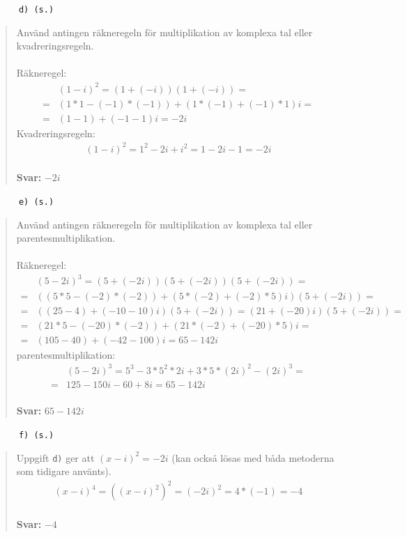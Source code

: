 \documentclass[a4paper]{article}
\newcommand{\tskcol}[1]{\textcolor{tskcol}{#1}}
\begin{document}
	\texttt{\tskcol{~~~~~~d) (s.)}}
	\begin{quotation}
		\noindent
		Använd antingen räkneregeln för multiplikation av komplexa tal eller kvadreringsregeln. \\ \\
		Räkneregel:
		\begin{align*}
		&(1-i)^2=
		(1+(-i))(1+(-i))= \\ =
		&(1*1-(-1)*(-1))+(1*(-1)+(-1)*1)i= \\ =
		&(1-1)+(-1-1)i=
		-2i
		\end{align*}
		Kvadreringsregeln:
		\begin{align*}
		(1-i)^2=
		1^2-2i+i^2=
		1-2i-1=
		-2i
		\end{align*}
		\\
		\textbf{Svar:} $-2i$
	\end{quotation}
	
	\pagebreak
	\texttt{\tskcol{~~~~~~e) (s.)}}
	\begin{quotation}
		\noindent
		Använd antingen räkneregeln för multiplikation av komplexa tal eller parentesmultiplikation. \\ \\
		Räkneregel:
		\begin{align*}
		&(5-2i)^3=
		(5+(-2i))(5+(-2i))(5+(-2i))= \\ =
		&((5*5-(-2)*(-2))+(5*(-2)+(-2)*5)i)(5+(-2i))= \\ =
		&((25-4)+(-10-10)i)(5+(-2i))=
		(21+(-20)i)(5+(-2i))= \\ =
		&(21*5-(-20)*(-2))+(21*(-2)+(-20)*5)i= \\ =
		&(105-40)+(-42-100)i= 
		65-142i
		\end{align*}
		parentesmultiplikation:
		\begin{align*}
		&(5-2i)^3=
		5^3-3*5^2*2i+3*5*(2i)^2-(2i)^3= \\ =
		&125-150i-60+8i=
		65-142i
		\end{align*}
		\\
		\textbf{Svar:} $65-142i$
	\end{quotation}
	
	\texttt{\tskcol{~~~~~~f) (s.)}}
	\begin{quotation}
		\noindent
		Uppgift \texttt{\tskcol{d)}} ger att $(x-i)^2=-2i$ (kan också lösas med båda metoderna som tidigare använts).
		\begin{align*}
		(x-i)^4=
		((x-i)^2)^2=
		(-2i)^2=
		4*(-1)=
		-4
		\end{align*}
		\\
		\textbf{Svar:} $-4$
	\end{quotation}
	
\end{document}
